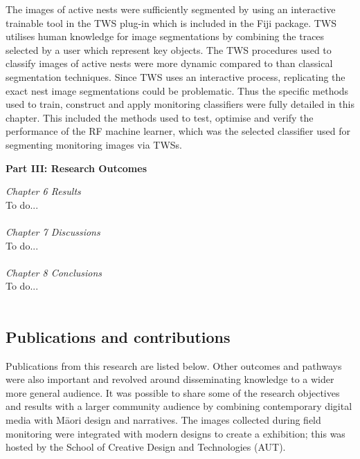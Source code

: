 The images of active nests were sufficiently segmented by using an interactive trainable tool in the \ac{TWS} plug-in which is included in the \ac{Fiji} package. \ac{TWS} utilises human knowledge for image segmentations by combining the traces selected by a user which represent key objects. The \ac{TWS} procedures used to classify images of active nests were more dynamic compared to than classical segmentation techniques. Since \ac{TWS} uses an interactive process, replicating the exact nest image segmentations could be problematic. Thus the specific methods used to train, construct and apply monitoring classifiers were fully detailed in this chapter. This included the methods used to test, optimise and verify the performance of the \ac{RF} machine learner, which was the selected classifier used for segmenting monitoring images via \acp{TWS}.
\\
\begin{flushright}
\textbf{Part III: Research Outcomes}
\end{flushright}
\emph{Chapter 6 Results}\\
To do...\\ \\
\emph{Chapter 7 Discussions}\\
To do...\\ \\
\emph{Chapter 8 Conclusions}\\
To do...\\ \\
\subsection{Publications and contributions}\label{sec:publications-and-contributions} 
Publications from this research are listed below. Other outcomes and pathways were also important and revolved around disseminating knowledge to a wider more general audience. It was possible to share some of the research objectives and results with a larger community audience by combining contemporary digital media with M\={a}ori design and narratives. The images collected during field monitoring were integrated with modern designs to create a exhibition; this was hosted by the School of Creative Design and Technologies (AUT).

